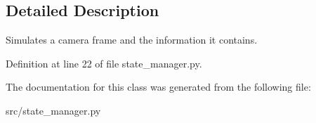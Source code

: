 \subsection{Detailed Description}
Simulates a camera frame and the information it contains. 



Definition at line 22 of file state\+\_\+manager.\+py.



The documentation for this class was generated from the following file\+:\begin{DoxyCompactItemize}
\item 
src/state\+\_\+manager.\+py\end{DoxyCompactItemize}
